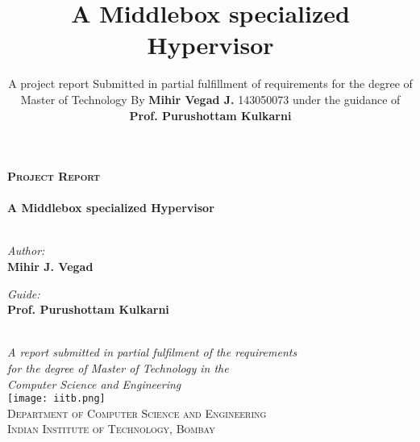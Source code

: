 \documentclass[a4paper,11pt]{report}
\title{\textbf { \vspace{3pt} A {\textbf M}iddlebox {\textbf s}pecialized {\textbf H}ypervisor}}
\author{\vspace{2cm} A project report \vspace{3cm} Submitted in partial fulfillment of requirements for the degree of \vspace{2cm} Master of Technology \vspace{2cm} By \vspace{2cm} \textbf{Mihir Vegad J.} \vspace{1cm} 143050073 \vspace{2cm} under the guidance of \vspace{2cm} \textbf{Prof. Purushottam Kulkarni} \vspace{2cm}  
  }
\begin{document}




\begin{titlepage}
\begin{center}

\vspace*{2cm}

\textsc{\Large \bf Project Report}\\[0.85cm]

\hrulefill
\\[1cm]
{\huge \bf A {\textbf M}iddlebox {\textbf s}pecialized {\textbf H}ypervisor}\\[0.4cm]
\hrulefill
\\[1cm]

\begin{minipage}{0.44\textwidth}
\begin{flushleft} \large
\emph{Author:}\\
{\Large \textbf {Mihir J. Vegad}}
\end{flushleft}
\end{minipage}
\begin{minipage}{0.44\textwidth}
\begin{flushright} \large
\emph{Guide:} \\
{\Large \textbf {Prof. Purushottam Kulkarni}}
\end{flushright}
\end{minipage}\\[2cm]

\large \textit{A report submitted in partial fulfilment of the requirements\\
[0.5cm] for the degree of Master of Technology in the\\ 
[0.5cm]Computer Science and Engineering}\\[2cm]

\texttt{[image: iitb.png]}\\[0.75cm]

\textsc{\large Department of Computer Science and Engineering\\Indian Institute of Technology, Bombay}
\\[1cm]

\end{center}
\end{titlepage}
\clearpage
\end{document}
